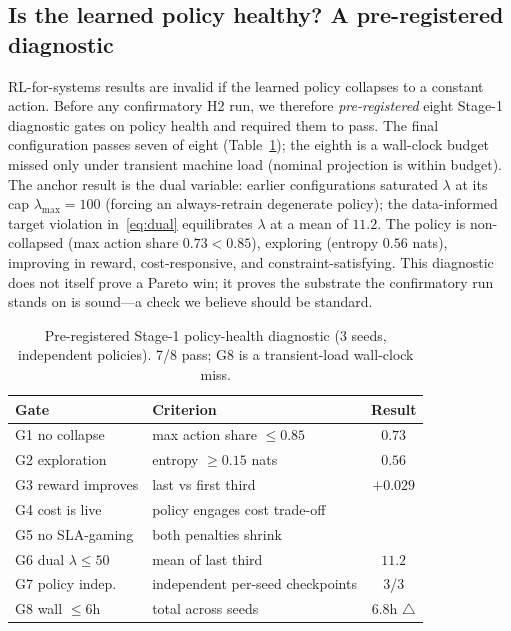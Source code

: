 \documentclass[conference]{IEEEtran}
\newcommand{\yes}{\textcolor{black}{\ding{51}}}
\begin{document}
\subsection{Is the learned policy healthy? A pre-registered diagnostic}\label{sec:diagnostic}
RL-for-systems results are invalid if the learned policy collapses to a
constant action. Before any confirmatory H2 run, we therefore
\emph{pre-registered} eight Stage-1 diagnostic gates on policy health and
required them to pass. The final configuration passes seven of eight
(Table~\ref{tab:gates}); the eighth is a wall-clock budget missed only
under transient machine load (nominal projection is within budget). The
anchor result is the dual variable: earlier configurations saturated
$\lambda$ at its cap $\lambda_{\max}=100$ (forcing an always-retrain
degenerate policy); the data-informed target violation in~\eqref{eq:dual}
equilibrates $\lambda$ at a mean of $11.2$. The policy is non-collapsed
(max action share $0.73<0.85$), exploring (entropy $0.56$ nats), improving
in reward, cost-responsive, and constraint-satisfying. This diagnostic
does not itself prove a Pareto win; it proves the substrate the
confirmatory run stands on is sound---a check we believe should be
standard.

\begin{table}[t]
\centering
\caption{Pre-registered Stage-1 policy-health diagnostic (3 seeds,
independent policies). 7/8 pass; G8 is a transient-load wall-clock miss.}
\label{tab:gates}
\setlength{\tabcolsep}{4pt}
\begin{tabular}{@{}llc@{}}
\toprule
\textbf{Gate} & \textbf{Criterion} & \textbf{Result}\\
\midrule
G1 no collapse       & max action share $\le 0.85$      & $0.73$ \yes\\
G2 exploration       & entropy $\ge 0.15$ nats          & $0.56$ \yes\\
G3 reward improves   & last vs first third              & $+0.029$ \yes\\
G4 cost is live      & policy engages cost trade-off    & \yes\\
G5 no SLA-gaming     & both penalties shrink            & \yes\\
G6 dual $\lambda\le50$ & mean of last third             & $11.2$ \yes\\
G7 policy indep.     & independent per-seed checkpoints & 3/3 \yes\\
G8 wall $\le 6$h     & total across seeds               & $6.8$h $\triangle$\\
\bottomrule
\end{tabular}
\end{table}
\end{document}
